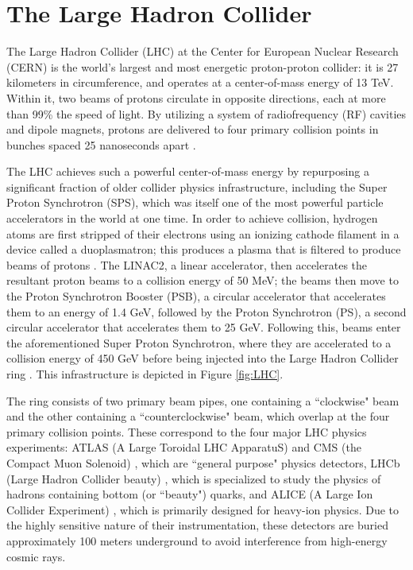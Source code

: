 \section{The Large Hadron Collider} \label{sec:LHC} 

The Large Hadron Collider (LHC) at the Center for European Nuclear Research (CERN) is the world's largest and most energetic proton-proton collider: it is 27 kilometers in circumference, and operates at a center-of-mass energy of 13 TeV. Within it, two beams of protons circulate in opposite directions, each at more than 99\% the speed of light. By utilizing a system of radiofrequency (RF) cavities and dipole magnets, protons are delivered to four primary collision points in bunches spaced 25 nanoseconds apart \cite{LHCTDR}.

The LHC achieves such a powerful center-of-mass energy by repurposing a significant fraction of older collider physics infrastructure, including the Super Proton Synchrotron (SPS), which was itself one of the most powerful particle accelerators in the world at one time. In order to achieve collision, hydrogen atoms are first stripped of their electrons using an ionizing cathode filament in a device called a duoplasmatron; this produces a plasma that is filtered to produce beams of protons \cite{SPS}. The LINAC2, a linear accelerator, then accelerates the resultant proton beams to a collision energy of 50 MeV; the beams then move to the Proton Synchrotron Booster (PSB), a circular accelerator that accelerates them to an energy of 1.4 GeV, followed by the Proton Synchrotron (PS), a second circular accelerator that accelerates them to 25 GeV. Following this, beams enter the aforementioned Super Proton Synchrotron, where they are accelerated to a collision energy of 450 GeV before being injected into the Large Hadron Collider ring \cite{LHCTDR}. This infrastructure is depicted in Figure \ref{fig:LHC}.

The ring consists of two primary beam pipes, one containing a ``clockwise" beam and the other containing a ``counterclockwise" beam, which overlap at the four primary collision points. These correspond to the four major LHC physics experiments: ATLAS (A Large Toroidal LHC ApparatuS) \cite{ATLAS_TDR} and CMS (the Compact Muon Solenoid) \cite{CMS_TDR}, which are ``general purpose" physics detectors, LHCb (Large Hadron Collider beauty) \cite{LHCb_TDR}, which is specialized to study the physics of hadrons containing bottom (or ``beauty") quarks, and ALICE (A Large Ion Collider Experiment) \cite{ALICE_TDR}, which is primarily designed for heavy-ion physics. Due to the highly sensitive nature of their instrumentation, these detectors are buried approximately 100 meters underground to avoid interference from high-energy cosmic rays.

